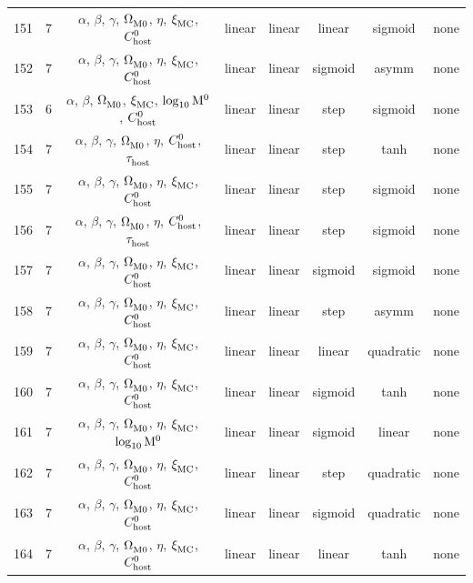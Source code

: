 \begin{longtable}{c c c c c c c c}
    151 & 7 & $\alpha$, $\beta$, $\gamma$, $\Omega_{\rm M0}^{}$, $\eta$, $\xi_{\rm MC}^{}$, $C_{\rm host}^{0}$ & linear & linear & linear & sigmoid & none \\
    152 & 7 & $\alpha$, $\beta$, $\gamma$, $\Omega_{\rm M0}^{}$, $\eta$, $\xi_{\rm MC}^{}$, $C_{\rm host}^{0}$ & linear & linear & sigmoid & asymm & none \\
    153 & 6 & $\alpha$, $\beta$, $\Omega_{\rm M0}^{}$, $\xi_{\rm MC}^{}$, $\log_{10}^{}{\rm M}^0$, $C_{\rm host}^{0}$ & linear & linear & step & sigmoid & none \\
    154 & 7 & $\alpha$, $\beta$, $\gamma$, $\Omega_{\rm M0}^{}$, $\eta$, $C_{\rm host}^{0}$, $\tau_{\rm host}^{}$ & linear & linear & step & tanh & none \\
    155 & 7 & $\alpha$, $\beta$, $\gamma$, $\Omega_{\rm M0}^{}$, $\eta$, $\xi_{\rm MC}^{}$, $C_{\rm host}^{0}$ & linear & linear & step & sigmoid & none \\
    156 & 7 & $\alpha$, $\beta$, $\gamma$, $\Omega_{\rm M0}^{}$, $\eta$, $C_{\rm host}^{0}$, $\tau_{\rm host}^{}$ & linear & linear & step & sigmoid & none \\
    157 & 7 & $\alpha$, $\beta$, $\gamma$, $\Omega_{\rm M0}^{}$, $\eta$, $\xi_{\rm MC}^{}$, $C_{\rm host}^{0}$ & linear & linear & sigmoid & sigmoid & none \\
    158 & 7 & $\alpha$, $\beta$, $\gamma$, $\Omega_{\rm M0}^{}$, $\eta$, $\xi_{\rm MC}^{}$, $C_{\rm host}^{0}$ & linear & linear & step & asymm & none \\
    159 & 7 & $\alpha$, $\beta$, $\gamma$, $\Omega_{\rm M0}^{}$, $\eta$, $\xi_{\rm MC}^{}$, $C_{\rm host}^{0}$ & linear & linear & linear & quadratic & none \\
    160 & 7 & $\alpha$, $\beta$, $\gamma$, $\Omega_{\rm M0}^{}$, $\eta$, $\xi_{\rm MC}^{}$, $C_{\rm host}^{0}$ & linear & linear & sigmoid & tanh & none \\
    161 & 7 & $\alpha$, $\beta$, $\gamma$, $\Omega_{\rm M0}^{}$, $\eta$, $\xi_{\rm MC}^{}$, $\log_{10}^{}{\rm M}^0$ & linear & linear & sigmoid & linear & none \\
    162 & 7 & $\alpha$, $\beta$, $\gamma$, $\Omega_{\rm M0}^{}$, $\eta$, $\xi_{\rm MC}^{}$, $C_{\rm host}^{0}$ & linear & linear & step & quadratic & none \\
    163 & 7 & $\alpha$, $\beta$, $\gamma$, $\Omega_{\rm M0}^{}$, $\eta$, $\xi_{\rm MC}^{}$, $C_{\rm host}^{0}$ & linear & linear & sigmoid & quadratic & none \\
    164 & 7 & $\alpha$, $\beta$, $\gamma$, $\Omega_{\rm M0}^{}$, $\eta$, $\xi_{\rm MC}^{}$, $C_{\rm host}^{0}$ & linear & linear & linear & tanh & none \\

\end{longtable}
